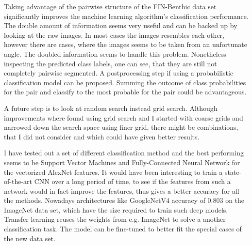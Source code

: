 Taking advantage of the pairwise structure of the FIN-Benthic data set significantly improves the machine learning algorithm's classification performance. The double amount of information seems very useful and can be backed up by looking at the raw images. In most cases the images resembles each other, however there are cases, where the images seems to be taken from an unfortunate angle. The doubled information seems to handle this problem. Nonetheless inspecting the predicted class labels, one can see, that they are still not completely pairwise segmented. A postprocessing step if using a probabilistic classification model can be proposed. Summing the outcome of class probabilities for the pair and classify to the most probable for the pair could be advantageous.

A future step is to look at random search instead grid search. Although improvements where found using grid search and I started with coarse grids and narrowed down the search space using finer grid, there might be combinations, that I did not consider and which could have given better results. 

I have tested out a set of different classification method and the best performing seems to be Support Vector Machines and Fully-Connected Neural Network for the vectorized AlexNet features. It would have been interesting to train a state-of-the-art CNN over a long period of time, to see if the features from such a network would in fact improve the features, thus gives a better accuracy for all the methods. Nowadays architectures like GoogleNetV4 accuracy of 0.803 on the ImageNet data set\cite{SzegedyIV16}, which have the size required to train such deep models. Transfer learning reuses the weights from e.g. ImageNet to solve a another classification task. The model can be fine-tuned to better fit the special cases of the new data set. 